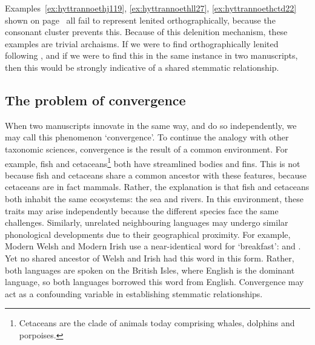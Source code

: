 Examples~\ref{ex:hyttrannoethj119}, \ref{ex:hyttrannoethll27}, \ref{ex:hyttrannoethctd22} shown on page~ all fail to represent lenited  orthographically, because the  consonant cluster prevents this. Because of this delenition mechanism, these examples are trivial archaisms. If we were to find orthographically lenited  following , and if we were to find this in the same instance in two manuscripts, then this would be strongly indicative of a shared stemmatic relationship.


\subsection{The problem of convergence}
\label{sec:problem-convergence}

When two manuscripts innovate in the same way, and do so independently, we may call this phenomenon `convergence'. To continue the analogy with other taxonomic sciences, convergence is the result of a common environment. For example, fish and cetaceans\footnote{Cetaceans are the clade of animals today comprising whales, dolphins and porpoises.} both have streamlined bodies and fins. This is not because fish and cetaceans share a common ancestor with these features, because cetaceans are in fact mammals. Rather, the explanation is that fish and cetaceans both inhabit the same ecosystems: the sea and rivers. In this environment, these traits may arise independently because the different species face the same challenges. Similarly, unrelated neighbouring languages may undergo similar phonological developments due to their geographical proximity. For example, Modern Welsh and Modern Irish use a near-identical word for `breakfast':  and . Yet no shared ancestor of Welsh and Irish had this word in this form. Rather, both languages are spoken on the British Isles, where English is the dominant language, so both languages borrowed this word from English. Convergence may act as a confounding variable in establishing stemmatic relationships.

